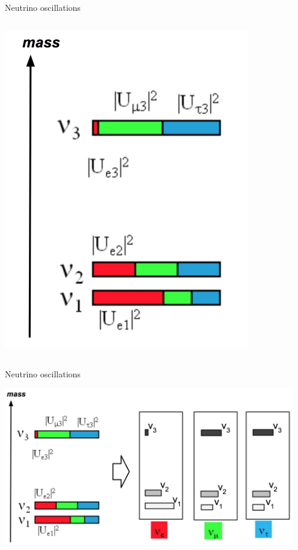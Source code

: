\begin{frame}{Neutrino oscillations}
\begin{columns}
\begin{column}{0.50\textwidth}
\begin{center}
   \includegraphics[width=0.80\textwidth]{./images/osc101/mass_spectrum_01}\\
   \vspace{0.3cm}
   \end{center}
 \end{column}
\end{columns}

\end{frame}


%
%
%

\begin{frame}{Neutrino oscillations}

\begin{center}
   \includegraphics[width=0.95\textwidth]{./images/osc101/mass_spectrum_2_flavours_01}\\
\end{center}

\end{frame}

